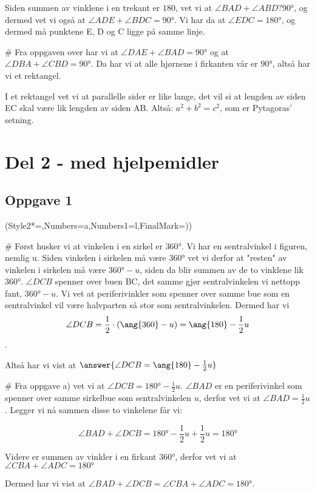 \begin{easylist}[enumerate]
	
	Siden summen av vinklene i en trekant er $180$, vet vi at $\angle BAD + \angle  ABD ? \ang{90}$, og dermed vet vi også at $\angle ADE + \angle BDC = \ang{90}$. Vi har da at $\angle EDC  = \ang{180}$, og dermed må punktene E, D og C ligge på samme linje.
	
	# Fra oppgaven over har vi at $\angle DAE + \angle BAD = \ang{90}$ og at $\angle DBA + \angle CBD = \ang{90}$. Da har vi at alle hjørnene i firkanten vår er $\ang{90}$, altså har vi et rektangel. 
	
	I et rektangel vet vi at parallelle sider er like lange, det vil si at lengden av siden EC skal være lik lengden av siden AB. Altså: $a^2 + b^2 = c^2$, som er Pytagoras' setning.
	
\end{easylist}
\newpage


\section*{Del 2 - med hjelpemidler}

\subsection*{Oppgave 1}
\begin{easylist}[enumerate]
	\ListProperties(Style2*=,Numbers=a,Numbers1=l,FinalMark={)})
	
	# Først husker vi at vinkelen i en sirkel er $\ang{360}$. Vi har en sentralvinkel i figuren, nemlig u. Siden vinkelen i sirkelen må være $\ang{360}$ vet vi derfor at "resten" av vinkelen i sirkelen må være $\ang{360} - u$, siden da blir summen av de to vinklene lik $\ang{360}$. $\angle DCB$ spenner over buen BC, det samme gjør sentralvinkelen vi nettopp fant, $\ang{360} - u$. Vi vet at periferivinkler som spenner over samme bue som en sentralvinkel vil være halvparten så stor som sentralvinkelen. Dermed har vi $$\angle DCB = \frac{1}{2} \cdot (\ang{360} - u) \\ = \ang{180} - \frac{1}{2}u$$.
	
	Altså har vi vist at $\answer{\angle DCB = \ang{180} - \frac{1}{2}u}$
	
	# Fra oppgave a) vet vi at $\angle DCB = \ang{180} - \frac{1}{2}u$. $\angle BAD$ er en periferivinkel som spenner over samme sirkelbue som sentralvinkelen $u$, derfor vet vi at  $\angle BAD = \frac{1}{2}u$. Legger vi nå sammen disse to vinkelene får vi:
	
	$$\angle BAD + \angle DCB = \ang{180} - \frac{1}{2}u + \frac{1}{2}u = \ang{180}$$
	
	Videre er summen av vinkler i en firkant $\ang{360}$, derfor vet vi at $\angle CBA + \angle ADC = \ang{180}$
	
	Dermed har vi vist at $\angle BAD + \angle DCB = \angle CBA + \angle ADC = \ang{180}$.
	
	
\end{easylist}
